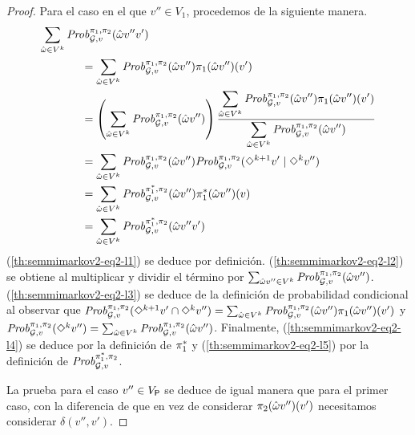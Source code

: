 \begin{proof}
  Para el caso en el que $v'' \in V_1$, procedemos de la siguiente manera.
  \begin{align}	
    \sum_{\hat{\omega} \in V^k}\Prob{\strat{1}}{\strat{2}}_{\StochG,v}(\hat{\omega}v''v') \hspace{-6em} & \notag\\
    \label{th:semmimarkov2-eq2-l1}
    & = \sum_{\hat{\omega} \in V^k}\Prob{\strat{1}}{\strat{2}}_{\StochG,v}(\hat{\omega}v'') \strat{1}(\hat{\omega}v'')(v')\\
    \label{th:semmimarkov2-eq2-l2}
    & = \left( \sum_{\hat{\omega} \in V^k}\Prob{\strat{1}}{\strat{2}}_{\StochG,v}(\hat{\omega}v'') \right) \frac{\displaystyle\sum_{\hat{\omega} \in V^k}\Prob{\strat{1}}{\strat{2}}_{\StochG,v}(\hat{\omega}v'') \strat{1}(\hat{\omega}v'')(v')}{\displaystyle\sum_{\hat{\omega} \in V^k}\Prob{\strat{1}}{\strat{2}}_{\StochG,v}(\hat{\omega}v'')} \\
    \label{th:semmimarkov2-eq2-l3}
    & = \sum_{\hat{\omega} \in V^k}\Prob{\strat{1}}{\strat{2}}_{\StochG,v}(\hat{\omega}v'') \Prob{\strat{1}}{\strat{2}}_{\StochG,v}(\Diamond^{k+1} v' \mid \Diamond^k v'') \\
    \label{th:semmimarkov2-eq2-l4}
    & = \sum_{\hat{\omega} \in V^k}\Prob{\starredstrat{1}}{\strat{2}}_{\StochG,v}(\hat{\omega}v'') \starredstrat{1}(\hat{\omega}v'')(v)\\
    \label{th:semmimarkov2-eq2-l5}
    & = \sum_{\hat{\omega} \in V^k}\Prob{\starredstrat{1}}{\strat{2}}_{\StochG,v}(\hat{\omega}v''v')
  \end{align}
  (\ref{th:semmimarkov2-eq2-l1}) se deduce por definición.
  (\ref{th:semmimarkov2-eq2-l2}) se obtiene al multiplicar y dividir el término por
  $\sum_{\hat{\omega}v'' \in V^k}\mathit{Prob}^{\pi_{1}, \pi_{2}}_{\mathcal{G},v}(\hat{\omega}v'')$.
  (\ref{th:semmimarkov2-eq2-l3}) se deduce de la definición de probabilidad condicional al observar que
  $\mathit{Prob}^{\pi_{1}, \pi_{2}}_{\mathcal{G},v}({\Diamond^{k+1} v'} \cap {\Diamond^k v''}) =
  \sum_{\hat{\omega} \in V^k}\mathit{Prob}^{\pi_{1}, \pi_{2}}_{\mathcal{G},v}(\hat{\omega}v'') \pi_{1}(\hat{\omega}v'')(v')$
  y 
  $\mathit{Prob}^{\pi_{1}, \pi_{2}}_{\mathcal{G},v}(\Diamond^{k} v'') =
  \sum_{\hat{\omega} \in V^k}\mathit{Prob}^{\pi_{1}, \pi_{2}}_{\mathcal{G},v}(\hat{\omega}v'')$.
  Finalmente, (\ref{th:semmimarkov2-eq2-l4}) se deduce por la definición de
  $\pi^*_{1}$ y (\ref{th:semmimarkov2-eq2-l5}) por la definición de 
  $\mathit{Prob}^{\pi^*_{1}, \pi_{2}}_{\mathcal{G},v}$.

  La prueba para el caso $v'' \in V_{\mathsf{P}}$ se deduce de igual manera que para el primer caso, con la diferencia de que en vez de considerar
  $\pi_{2}(\hat{\omega}v'')(v')$ necesitamos considerar
  $\delta(v'',v')$.




\end{proof}
